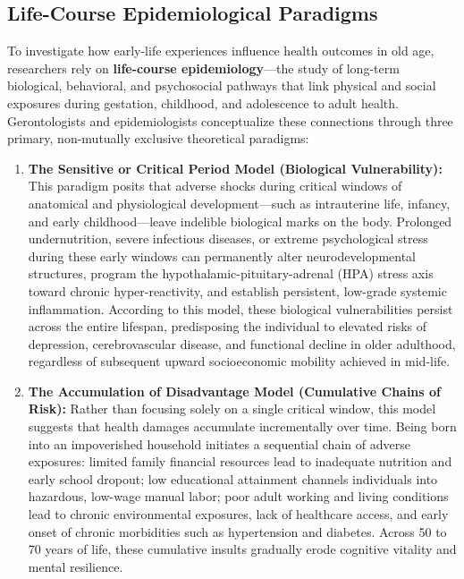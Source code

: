 \subsection{Life-Course Epidemiological Paradigms}
To investigate how early-life experiences influence health outcomes in old age, researchers rely on \textbf{life-course epidemiology}—the study of long-term biological, behavioral, and psychosocial pathways that link physical and social exposures during gestation, childhood, and adolescence to adult health. Gerontologists and epidemiologists conceptualize these connections through three primary, non-mutually exclusive theoretical paradigms:

\begin{enumerate}[label=(\alph*)]
    \item \textbf{The Sensitive or Critical Period Model (Biological Vulnerability):}
    This paradigm posits that adverse shocks during critical windows of anatomical and physiological development—such as intrauterine life, infancy, and early childhood—leave indelible biological marks on the body. Prolonged undernutrition, severe infectious diseases, or extreme psychological stress during these early windows can permanently alter neurodevelopmental structures, program the hypothalamic-pituitary-adrenal (HPA) stress axis toward chronic hyper-reactivity, and establish persistent, low-grade systemic inflammation. According to this model, these biological vulnerabilities persist across the entire lifespan, predisposing the individual to elevated risks of depression, cerebrovascular disease, and functional decline in older adulthood, regardless of subsequent upward socioeconomic mobility achieved in mid-life.

    \item \textbf{The Accumulation of Disadvantage Model (Cumulative Chains of Risk):}
    Rather than focusing solely on a single critical window, this model suggests that health damages accumulate incrementally over time. Being born into an impoverished household initiates a sequential chain of adverse exposures: limited family financial resources lead to inadequate nutrition and early school dropout; low educational attainment channels individuals into hazardous, low-wage manual labor; poor adult working and living conditions lead to chronic environmental exposures, lack of healthcare access, and early onset of chronic morbidities such as hypertension and diabetes. Across 50 to 70 years of life, these cumulative insults gradually erode cognitive vitality and mental resilience.


\end{enumerate}
